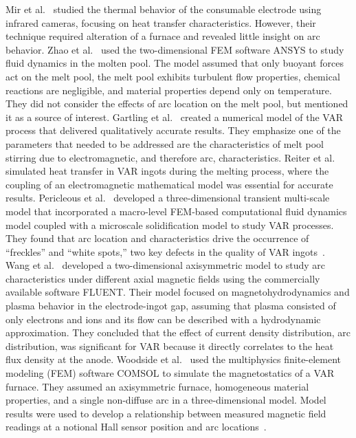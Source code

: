 \documentclass[onehalf,11pt]{beavtex}
\begin{document}
Mir et al.~\cite{Mir:2010cq} studied the thermal behavior of the consumable electrode using infrared cameras, focusing on heat transfer characteristics.
However, their technique required alteration of a furnace  and revealed little insight on arc behavior.
Zhao et al.~\cite{Zhao:2011es} used the two-dimensional FEM software ANSYS to study fluid dynamics in the molten pool.
The model assumed that only buoyant forces act on the melt pool, the melt pool exhibits turbulent flow properties, chemical reactions are negligible, and material properties depend only on temperature. 
They did not consider the effects of arc location on the melt pool, but mentioned it as a source of interest.
Gartling et al.~\cite{Gartling:1997ka} created a numerical model of the VAR process that delivered qualitatively accurate results. 
They emphasize one of the parameters that needed to be addressed are the characteristics of melt pool stirring due to electromagnetic, and therefore arc, characteristics. 
Reiter et al.~\cite{Reiter:2003wk} simulated heat transfer in VAR ingots during the melting process, where the coupling of an electromagnetic mathematical model was essential for accurate results. 
Pericleous et al.~\cite{Pericleous:2013kb} developed a three-dimensional transient multi-scale model that incorporated a macro-level FEM-based computational fluid dynamics model coupled with a microscale solidification model to study VAR processes.
They found that arc location and characteristics drive the occurrence of ``freckles'' and ``white spots,'' two key defects in the quality of VAR ingots~\cite{Pericleous:2013kb}.
Wang et al.~\cite{Wang:2005fg} developed a two-dimensional axisymmetric model to study arc characteristics under different axial magnetic fields using the commercially available software FLUENT. 
Their model focused on magnetohydrodynamics and plasma behavior in the electrode-ingot gap, assuming that plasma consisted of only electrons and ions and its flow can be described with a hydrodynamic approximation.  
They concluded that the effect of current density distribution, arc distribution, was significant for VAR because it directly correlates to the heat flux density at the anode.
Woodside et al.~\cite{Woodside:2010fi,Woodside:2013cf} used the multiphysics finite-element modeling (FEM) software COMSOL to simulate the magnetostatics of a VAR furnace.
They assumed an axisymmetric furnace, homogeneous material properties, and a single non-diffuse arc in a three-dimensional model.
Model results were used to develop a relationship between measured magnetic field readings at a notional Hall sensor position and arc locations~\cite{Woodside:2013cf}.
\end{document}
